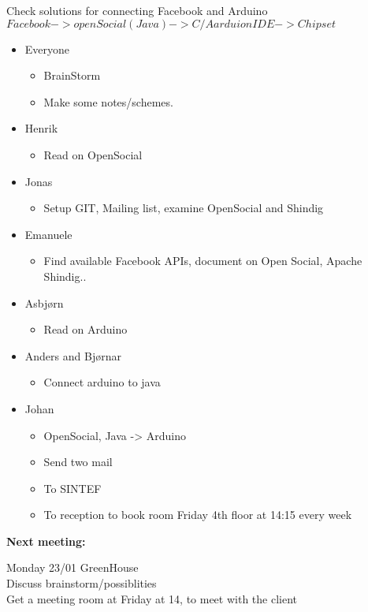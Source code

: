 Check solutions for connecting Facebook and Arduino\\
 $Facebook->openSocial(Java)->C/AarduionIDE->Chipset$ 
\begin{itemize}
\item Everyone

\begin{itemize}
\item BrainStorm 
\item Make some notes/schemes. 
\end{itemize}
\item Henrik

\begin{itemize}
\item Read on OpenSocial 
\end{itemize}
\item Jonas

\begin{itemize}
\item Setup GIT, Mailing list, examine OpenSocial and Shindig 
\end{itemize}
\item Emanuele

\begin{itemize}
\item Find available Facebook APIs, document on Open Social, Apache Shindig.. 
\end{itemize}
\item Asbjørn

\begin{itemize}
\item Read on Arduino 
\end{itemize}
\item Anders and Bjørnar

\begin{itemize}
\item Connect arduino to java 
\end{itemize}
\item Johan

\begin{itemize}
\item OpenSocial, Java -\textgreater{} Arduino 
\item Send two mail 
\item To SINTEF 
\item To reception to book room Friday 4th floor at 14:15 every week 
\end{itemize}
\end{itemize}
\textbf{Next meeting:}

Monday 23/01 GreenHouse\\
 Discuss brainstorm/possiblities\\
 Get a meeting room at Friday at 14, to meet with the client 
